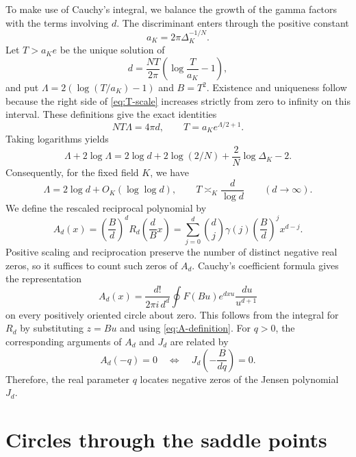 \documentclass[11pt,reqno]{amsart}
\numberwithin{equation}{section}
\newcommand{\dd}{\,d}
\begin{document}
To make use of Cauchy's integral,
we balance the growth
of the gamma factors with the terms involving $d$. The discriminant
enters through the positive constant
\begin{equation}\label{eq:aK-definition}
 a_K=2\pi\Delta_K^{-1/N}.
\end{equation}
Let $T>a_Ke$ be the unique solution of
\begin{equation}\label{eq:T-scale}
 d=\frac{NT}{2\pi}\left(\log\frac{T}{a_K}-1\right),
\end{equation}
and put $\Lambda=2(\log(T/a_K)-1)$ and $B=T^2$.
Existence and uniqueness follow because the right side of
\eqref{eq:T-scale} increases strictly from zero to infinity on
this interval. These definitions give the exact identities
\begin{equation}\label{eq:T-identities}
 NT\Lambda=4\pi d,\qquad T=a_Ke^{\Lambda/2+1}.
\end{equation}
Taking logarithms yields
\[
 \Lambda+2\log\Lambda
 =2\log d+2\log(2/N)+\frac2N\log\Delta_K-2.
\]
Consequently, for the fixed field $K$, we have
\begin{equation}\label{eq:T-comparisons}
 \Lambda=2\log d+O_K(\log\log d),\qquad
 T\asymp_K\frac d{\log d}\qquad(d\to\infty).
\end{equation}
We define the rescaled reciprocal polynomial by
\begin{equation}\label{eq:A-definition}
 A_d(x)=\left(\frac Bd\right)^dR_d\!\left(\frac dB x\right)
       =\sum_{j=0}^d\binom dj\gamma(j)\left(\frac Bd\right)^j x^{d-j}.
\end{equation}
Positive scaling and reciprocation preserve the number of distinct
negative real zeros, so it suffices to count such zeros of $A_d$.
Cauchy's coefficient formula gives the representation
\begin{equation}\label{eq:Cauchy}
 A_d(x)=\frac{d!}{2\pi i\,d^d}
       \oint F(Bu)e^{dxu}\frac{\dd u}{u^{d+1}}
\end{equation}
on every positively oriented circle about zero. This follows
from the integral for $R_d$ by substituting $z=Bu$ and using
\eqref{eq:A-definition}.
For $q>0$, the corresponding arguments of $A_d$ and $J_d$ are
related by
\begin{equation}\label{eq:root-dictionary}
 A_d(-q)=0\quad\Longleftrightarrow\quad
 J_d\!\left(-\frac{B}{dq}\right)=0.
\end{equation}
Therefore, the real parameter $q$ locates negative
zeros of the Jensen polynomial $J_d$.

\section{Circles through the saddle points}\label{sec:geometry}
\end{document}

